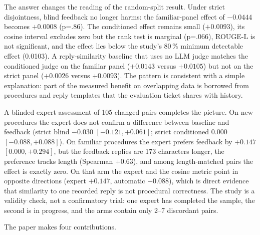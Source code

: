 The answer changes the reading of the random-split result. Under strict disjointness,
blind feedback no longer harms: the familiar-panel effect of $-0.0444$ becomes
$+0.0008$ (p=.86). The conditioned effect remains small ($+0.0093$), its cosine
interval excludes zero but the rank test is marginal (p=.066), ROUGE-L is not
significant, and the effect lies below the study's 80\,\% minimum detectable
effect (0.0103). A reply-similarity baseline that uses no LLM judge matches
the conditioned judge on the familiar panel ($+0.0143$ versus $+0.0105$) but not
on the strict panel ($+0.0026$ versus $+0.0093$). The pattern is consistent with a
simple explanation: part of the measured benefit on overlapping data is borrowed
from procedures and reply templates that the evaluation ticket shares with
history.

A blinded expert assessment of 105 changed pairs completes the picture. On new
procedures the expert does not confirm a difference between baseline and feedback (strict
blind $-0.030$ $[-0.121,+0.061]$; strict conditioned $0.000$
$[-0.088,+0.088]$). On familiar procedures the expert prefers feedback by $+0.147$
$[0.000,+0.294]$, but the feedback replies are 173 characters longer, the
preference tracks length (Spearman $+0.63$), and among length-matched pairs the
effect is exactly zero. On that arm the expert and the cosine metric point in
opposite directions (expert $+0.147$, automatic $-0.088$), which is direct
evidence that similarity to one recorded reply is not procedural correctness. The
study is a validity check, not a confirmatory trial: one expert has completed the
sample, the second is in progress, and the arms contain only 2--7 discordant pairs.

The paper makes four contributions.

